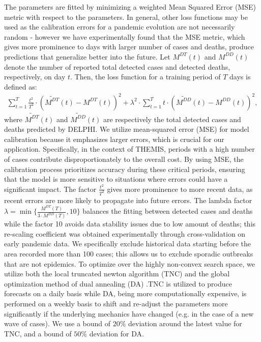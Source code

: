 \documentclass[msom,blindrev]{informs3} %
\begin{document}
\begin{APPENDICES}
The parameters are fitted by minimizing a weighted Mean Squared Error (MSE) metric with respect to the parameters. In general, other loss functions may be used as the calibration errors for a pandemic evolution are not necessarily random - however we have experimentally found that the MSE metric, which gives more prominence to days with larger number of cases and deaths, produce predictions that generalize better into the future.  Let  $M^{DT}(t)$ and $M^{DD}(t)$ denote  the number of reported total detected cases and detected deaths, respectively, on day $t$. Then, the loss function for a training period of $T$ days is defined as:
$$
\begin{aligned}
\sum_{t=1}^{T} \frac{t^2}{T^2} \cdot \left(\widetilde{M^{DT}}(t) - M^{DT}(t)\right)^2 + \lambda^2 \cdot \sum_{t=1}^{T} t \cdot \left(\widetilde{M^{DD}}(t) - M^{DD}(t)\right)^2,
\end{aligned}
$$
where $\widetilde{M^{DT}}(t)$ and $\widetilde{M^{DD}}(t)$ are respectively the total detected cases and deaths predicted by DELPHI. We utilize mean-squared error (MSE) for model calibration because it emphasizes larger errors, which is crucial for our application. Specifically, in the context of THEMIS, periods with a high number of cases contribute disproportionately to the overall cost. By using MSE, the calibration process prioritizes accuracy during these critical periods, ensuring that the model is more sensitive to situations where errors could have a significant impact. The factor $\frac{t^2}{T^2}$ gives more prominence to more recent data, as recent errors are more likely to propagate into future errors. The lambda factor $\lambda= \min\Big\{ \frac{M^{DT}(T)}{3\cdot M^{DD}(T)}, 10\Big\}$ balances the fitting between detected cases and deaths while the factor 10 avoids data stability issues due to low amount of deaths; this re-scaling coefficient was obtained experimentally through cross-validation on early pandemic data. We specifically exclude historical data starting before the area recorded more than 100 cases; this allows us to exclude sporadic outbreaks that are not epidemics. To optimize over the highly non-convex search space, we utilize both the local truncated newton algorithm (TNC)  and the global optimization method of dual annealing (DA) .TNC is utilized to produce forecasts on a daily basis while DA, being more computationally expensive, is performed on a weekly basis to shift and re-adjust the parameters more significantly if the underlying mechanics have changed (e.g. in the case of a new wave of cases). We use a bound of $20\%$ deviation around the latest value for TNC, and a bound of $50\%$ deviation for DA. 
\vfill
\newpage
\newpage

\end{APPENDICES}
\end{document}
